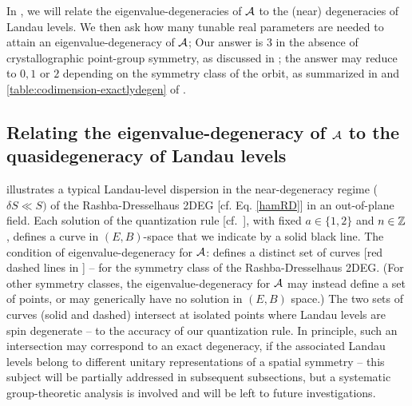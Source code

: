 \documentclass[aps, showpacs, twocolumn, notitlepage, superscriptaddress]{revtex4-1}
\begin{document}
In , we will relate the eigenvalue-degeneracies of  ${\cal A}$ to the (near) degeneracies of Landau levels. We then ask how many tunable real parameters are needed to attain an eigenvalue-degeneracy of ${\cal A}$;  Our answer is  $3$ in the absence of crystallographic point-group symmetry, as discussed in ; the answer may reduce to $0,1$ or $2$ depending on the symmetry class of the orbit, as  summarized in  and \ref{table:codimension-exactlydegen} of .



\subsection{Relating the eigenvalue-degeneracy of ${\cal A}$ to the quasidegeneracy of Landau levels}\label{sec:relatedegeneracies}


 illustrates a typical Landau-level dispersion in the near-degeneracy regime ($\delta S{\ll} S)$ of the Rashba-Dresselhaus 2DEG [cf. Eq. \ref{hamRD}] in an out-of-plane field. Each solution of the quantization rule [cf.\ ], with fixed $a\in \{1,2\}$ and $n \in \mathbb{Z}$, defines a curve in $(E,B)$-space that we indicate by  a solid black line. The condition of eigenvalue-degeneracy for ${\cal A}$:  
defines a distinct set of curves [red dashed lines in ] -- for the symmetry class of the Rashba-Dresselhaus 2DEG. (For other symmetry classes, the eigenvalue-degeneracy for ${\cal A}$ may instead define a set of points, or may generically have no solution in $(E,B)$ space.)   The two sets of curves (solid and dashed) intersect at isolated points where Landau levels are spin degenerate -- to the accuracy of our quantization rule. In principle, such an intersection may correspond to an exact  degeneracy, if the associated Landau levels belong to different unitary representations of a spatial symmetry -- this subject will be partially addressed in subsequent subsections, but a systematic group-theoretic analysis is involved and will be left to future investigations.
\end{document}
